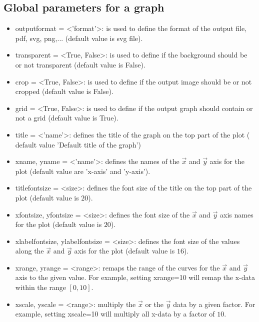 \subsection{Global parameters for a graph}
\begin{itemize}
\item \textsf{outputformat} = <'format'>: is used to define the format of
the output file, \ie pdf, svg, png,... (default value is svg file).
\item \textsf{transparent} = <True, False>: is used to define if the background
should be or not transparent (default value is False).
\item \textsf{crop} = <True, False>: is used to define if the output image
should be or not cropped (default value is False).
\item \textsf{grid} = <True, False>: is used to define if the output graph
should contain or not a grid (default value is True).
\item \textsf{title} = <'name'>: defines the title of the graph on the top
part of the plot ( default value 'Default title of the graph')
\item \textsf{xname, yname} = <'name'>: defines the names of the $\overrightarrow{x}$
and $\overrightarrow{y}$ axis for the plot (default value are 'x-axis'
and 'y-axis').
\item \textsf{titlefontsize} = <size>: defines the font size of the title
on the top part of the plot (default value is $20$).
\item \textsf{xfontsize, yfontsize} = <size>: defines the font size of the
$\overrightarrow{x}$ and $\overrightarrow{y}$ axis names for the
plot (default value is $20$).
\item \textsf{xlabelfontsize, ylabelfontsize} = <size>: defines the font
size of the values along the $\overrightarrow{x}$ and $\overrightarrow{y}$
axis for the plot (default value is $16$).
\item \textsf{xrange, yrange} = <range>: remaps the range of the curves
for the $\overrightarrow{x}$ and $\overrightarrow{y}$ axis to the
given value. For example, setting \textsf{xrange=10} will remap the
x-data within the range $[0,10]$. 
\item \textsf{xscale, yscale} = <range>: multiply the $\overrightarrow{x}$
or the $\overrightarrow{y}$ data by a given factor. For example,
setting \textsf{xscale=10} will multiply all x-data by a factor of
$10$.
\end{itemize}

